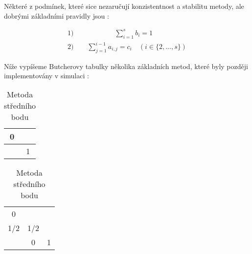 \documentclass[12pt, a4paper,
 twoside,        %
 openright
]{report}
\begin{document}
Některé z podmínek, které sice nezaručují konzistentnost a stabilitu metody, ale dobrými základními pravidly jsou \cite{Butcher_tab_def}:

\begin{equation}
    \label{eq:RK_def}
    \begin{gathered}
        \text{1)} \quad \quad \qquad \qquad \sum_{i=1}^{s} b_i = 1 \qquad \qquad \\
        \text{2)} \quad \quad \sum_{j=1}^{i-1} a_{i,j} = c_i \quad (i \in \{2,...,s\})
    \end{gathered}
\end{equation}

Níže vypíšeme Butcherovy tabulky několika základních metod, které byly později implementovány v simulaci \cite{RK_methods_list}:

\begin{table}[H]
    \parbox{.45\linewidth}{
        \centering
        \caption[Butcherova tabulka Eulerovy metody]{\textbf{Eulerova metoda}}
        \begin{tabular}{c | c}
            0 &   \\
            \hline
              & 1 \\
        \end{tabular}
    }
    \hfill
    \parbox{.45\linewidth}{
        \centering
        \caption[Butcherova tabulka metody středního bodu]{Metoda středního bodu}
        \begin{tabular}{c | c c}
            0   &         \\
            1/2 & 1/2     \\
            \hline
                & 0   & 1 \\
        \end{tabular}
    }
\end{table}
\end{document}

